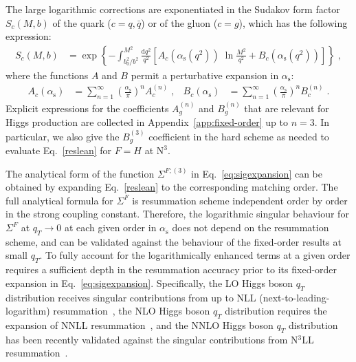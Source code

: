 \documentclass[12pt]{article}
\DeclareRobustCommand{\alphas}{\ensuremath{\alpha_{\mathrm{s}}}\xspace}
\DeclareRobustCommand{\as}{\alphas}
\DeclareRobustCommand{\asOpi}{\ensuremath{\left(\frac{\as}{\pi}\right)}} %
\DeclareRobustCommand{\qt}{\ensuremath{q_T}\xspace}
\DeclareRobustCommand{\rd}{\ensuremath{\mathrm{d}}}
\DeclareRobustCommand{\LO}{\text{LO}\xspace}
\DeclareRobustCommand{\N}[1]{\ensuremath{\text{N}^{#1}}} %
\begin{document}
The large logarithmic corrections are exponentiated in the Sudakov form factor $S_c(M,b)$ of the quark  ($c=q, {\bar q}$) or of the gluon ($c=g$), which has the following  expression:
\begin{align}
  S_c(M,b) &= 
  \exp \left\{ - \int_{b_0^2/b^2}^{M^2} \frac{\rd q^2}{q^2} 
  \left[ A_c(\as(q^2)) \;\ln \frac{M^2}{q^2} + B_c(\as(q^2)) \right] \right\} 
  \;,
  \label{formfact}
\end{align}
where the functions $A$ and $B$ permit a perturbative expansion in $\as$:
\begin{align}
  A_c(\as) &= 
  \sum_{n=1}^\infty \asOpi^n A_c^{(n)} \;,
  &
  B_c(\as) &= 
  \sum_{n=1}^\infty \asOpi^n B_c^{(n)} \;.
  \label{eq:abexp}
\end{align}
Explicit expressions for the coefficients $A_g^{(n)}$ and $B_g^{(n)}$ that are relevant for Higgs production are collected in Appendix~\ref{app:fixed-order} up to $n=3$.
In particular, we also give the $B_g^{(3)}$ coefficient in the hard scheme as needed to evaluate Eq.~\eqref{reslean} for $F=H$ at \N3\LO.

The analytical form of the function $\Sigma^{F;(3)}$ in Eq.~\eqref{eq:sigexpansion} can be obtained by expanding Eq.~\eqref{reslean} to the corresponding matching order. The full analytical formula for $\Sigma^{F}$ is resummation scheme independent order by order in the strong coupling constant. Therefore, the logarithmic singular behaviour for $\Sigma^{F}$ at $\qt\rightarrow 0$ at 
each given order in $\as$ does not depend on the 
resummation scheme, and can be validated against the behaviour of the fixed-order results at small $\qt$. To fully 
account for the logarithmically enhanced terms at a given order requires a sufficient depth in the resummation accuracy prior to 
its fixed-order expansion in Eq.~\eqref{eq:sigexpansion}. Specifically, the LO Higgs boson $\qt$ distribution receives singular contributions from up to NLL (next-to-leading-logarithm) resummation~\cite{Catani:1988vd,Kauffman:1991cx}, the NLO Higgs boson $\qt$ distribution requires the expansion of NNLL resummation~\cite{deFlorian:2001zd,deFlorian:2000pr,Becher:2012yn,Neill:2015roa}, and the NNLO Higgs boson $\qt$ distribution has been recently validated against the singular contributions from N$^3$LL resummation~\cite{Chen:2018pzu,Bizon:2018foh}. 
\end{document}
